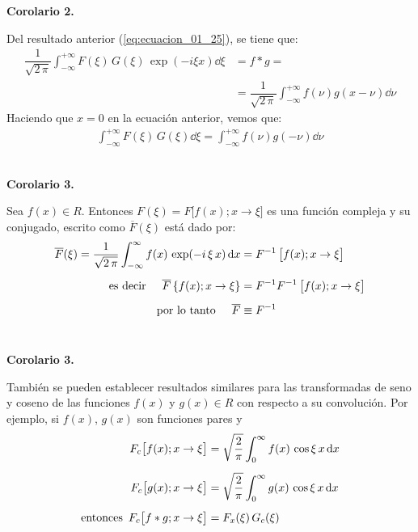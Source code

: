 \newpage

\textbf{Corolario 2.}

Del resultado anterior (\ref{eq:ecuacion_01_25}), se tiene que:
\begin{align*}
\dfrac{1}{\sqrt{2 \, \pi}} \int_{-\infty}^{+\infty} F(\xi) \, G(\xi) \, \exp(- i \xi x) \dd{\xi} &= f * g =\\[0.5em]
&= \dfrac{1}{\sqrt{2 \, \pi}} \int_{-\infty}^{+\infty} f(\nu) g(x - \nu) \dd{\nu}
\end{align*}
Haciendo que $x = 0$ en la ecuación anterior, vemos que:
\begin{align}
\int_{-\infty}^{+\infty} F(\xi) \, G(\xi) \dd{\xi} = \int_{-\infty}^{+\infty} f(\nu) g(-\nu) \dd{\nu}
\label{eq:ecuacion_01_26}
\end{align}
\\
\bigskip

\textbf{Corolario 3.}

Sea $f(x) \in R$. Entonces $F(\xi) = F \big[f(x); x \to \xi\big]$ es una función compleja y su conjugado, escrito como $\overline{F}(\xi)$ está dado por:
\begin{align}
\begin{aligned}[b]
\overline{F}(\xi) = \dfrac{1}{\sqrt{2 \, \pi}} \int_{-\infty}^{\infty} f(x) \, \exp(-i \, \xi \, x) \dd{x} &= F^{-1} \, \big[f(x); x \to \xi\big] \\[0.5em]
\mbox{es decir} \hspace{0.5cm} \overline{F} \left\{f(x); x \to \xi \right\} &= F^{-1} F^{-1} \, \big[f(x); x \to \xi \big] \\[0.5em]
\mbox{por lo tanto} \hspace{0.5cm} \overline{F} &\equiv F^{-1}
\end{aligned}
\label{eq:ecuacion_01_27}
\end{align}
\\
\bigskip

\textbf{Corolario 3.}

También se pueden establecer resultados similares para las transformadas de seno y coseno de las funciones $f (x)$ y $g (x) \in R$ con respecto a su convolución. Por ejemplo, si $f (x)$, $g (x)$ son funciones pares y
\begin{align}
\begin{aligned}[b]
F_{c} \big[f(x); x \to \xi \big] &= \sqrt{\dfrac{2}{\pi}} \int_{0}^{\infty} f(x) \, \cos \xi \, x \dd{x} \\[0.5em]
F_{c} \big[g(x); x \to \xi \big] &= \sqrt{\dfrac{2}{\pi}} \int_{0}^{\infty} g(x) \, \cos \xi \, x \dd{x} \\[0.5em]
\mbox{entonces} \hspace{0.5em} F_{c} \big[f * g; x \to \xi \big] &= F_{x}(\xi) \, G_{c}(\xi)
\end{aligned}
\label{eq:ecuacion_01_28}
\end{align}

